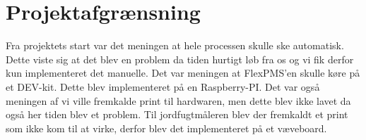\chapter{Projektafgrænsning}
Fra projektets start var det meningen at hele processen skulle ske automatisk. Dette viste sig at det blev en problem da tiden hurtigt løb fra os og vi fik derfor kun implementeret det manuelle. Det var meningen at FlexPMS'en skulle køre på et DEV-kit. Dette blev implementeret på en Raspberry-PI. Det var også meningen af vi ville fremkalde print til hardwaren, men dette blev ikke lavet da også her tiden blev et problem. Til jordfugtmåleren blev der fremkaldt et print som ikke kom til at virke, derfor blev det implementeret på et væveboard.  